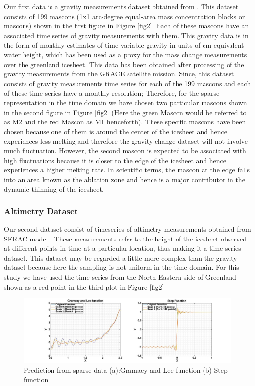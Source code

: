 \documentclass[procedia]{easychair}
\begin{document}
Our first data is a gravity measurements dataset obtained from \cite{luthcke2013antarctica}. This dataset consists of 199 mascons (1x1 arc-degree equal-area mass concentration blocks or mascons) shown in the first figure in Figure \ref{fig2}. Each of these mascons have an associated time series of gravity measurements with them. This gravity data is in the form of monthly estimates of time-variable gravity in units of cm equivalent water height, which has been used as a proxy for the mass change measurements over the greenland icesheet. This data has been obtained after processing of the gravity measurements from the GRACE satellite mission. Since, this dataset consists of gravity measurements time series for each of the 199 mascons and each of these time series have a monthly resolution; Therefore, for the sparse representation in the time domain we have chosen two particular mascons shown in the second figure in Figure \ref{fig2} (Here the green Mascon would be referred to as M2 and the red Mascon as M1 henceforth). These specific mascons have been chosen because one of them is around the center of the icesheet and hence experiences less melting and therefore the gravity change dataset will not involve much fluctuation. However, the second mascon is expected to be associated with high fluctuations because it is closer to the edge of the icesheet and hence experiences a higher melting rate. In scientific terms, the mascon at the edge falls into an area known as the ablation zone and hence is a major contributor in the dynamic thinning of the icesheet.

\subsubsection{Altimetry Dataset}

Our second dataset consist of timeseries of altimetry measurements obtained from SERAC model  \cite{schenk2012new}. These measurements refer to the height of the icesheet observed at different points in time at a particular location, thus making it a time series dataset. This dataset may be regarded a little more complex than the gravity dataset because here the sampling is not uniform in the time domain. For this study we have used the time series from the North Eastern side of Greenland shown as a red point in the third plot in Figure \ref{fig2}



\begin{figure}[]  %
	\centering
	\includegraphics[width=6in]{fig3.jpg}
	\caption[Optional caption]{Prediction from sparse data (a):Gramacy and Lee function (b) Step function}
	\label{fig3} %
\end{figure}
\end{document}

